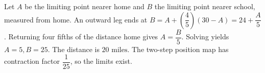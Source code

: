 Let $A$ be the limiting point nearer home and $B$ the limiting point nearer school, measured from home. An outward leg ends at $B=A+(\dfrac{4}{5})(30-A)=24+\dfrac{A}{5}$. Returning four fifths of the distance home gives $A=\dfrac{B}{5}$. Solving yields $A=5,B=25$. The distance is $\boxed{20\text{ miles}}$. The two-step position map has contraction factor $\dfrac{1}{25}$, so the limits exist.

